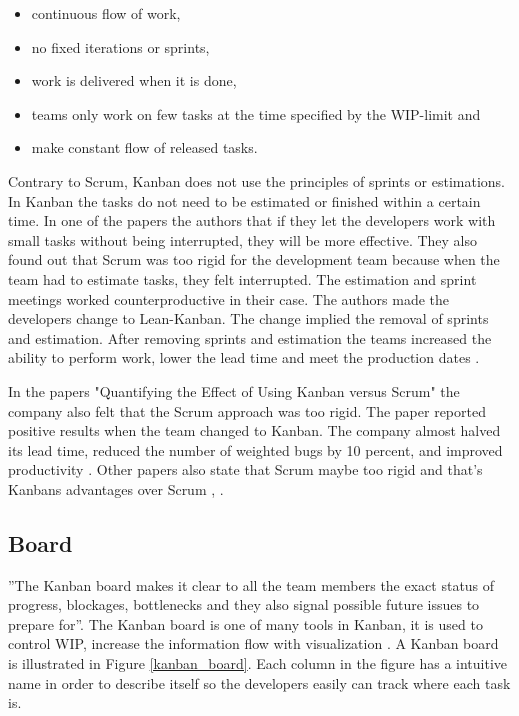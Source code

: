 \documentclass[UKenglish]{ifimaster}  %
\begin{document}
\begin{itemize}
\item continuous flow of work,
\item	no fixed iterations or sprints,
\item work is delivered when it is done,
\item teams only work on few tasks at the time specified by the WIP-limit and
\item make constant flow of released tasks.
\end{itemize}


Contrary to Scrum, Kanban does not use the principles of sprints or estimations. In Kanban the tasks do not need to be estimated or finished within a certain time. In one of the papers the authors that if they let the developers work with small tasks without being interrupted, they will be more effective. They also found out that Scrum was too rigid for the development team because when the team had to estimate tasks, they felt interrupted.  The estimation and sprint meetings worked counterproductive in their case. The authors made the developers change to Lean-Kanban.  The change implied the removal of sprints and estimation. After removing sprints and estimation the teams increased the ability to perform work, lower the lead time and meet the production dates \parencite{SMR:SMR1599}.

In the papers "Quantifying the Effect of Using Kanban versus Scrum" the company also felt that the Scrum approach was too rigid. The paper reported positive results when the team changed to Kanban.  The company almost halved its lead time, reduced the number of weighted bugs by 10 percent, and improved productivity \parencite{Dag}. Other papers also state that Scrum maybe too rigid and that's Kanbans advantages over Scrum \parencite{beedle1999scrum}, \parencite{brekkanintroducing}.  

\subsection {Board}
''The Kanban board makes it clear to all the team members the exact status of progress, blockages, bottlenecks and they also signal possible future issues to prepare for''\parencite{Joyce}.  The Kanban board is one of many tools in Kanban, it is used to control WIP, increase the information flow with visualization \parencite{SMR:SMR1599}. A Kanban board is illustrated in Figure \ref{kanban_board}. Each column in the figure has a intuitive name in order to describe itself so the developers easily can track where each task is. 
\end{document}
